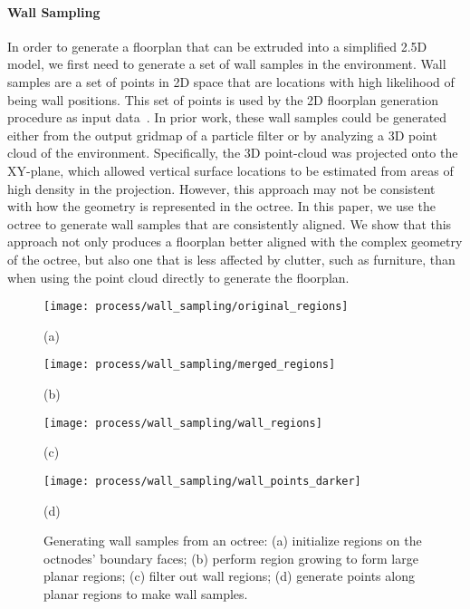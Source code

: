\documentclass[review]{acmsiggraph}
\begin{document}
\paragraph*{Wall Sampling}
\label{pg:wallsampling}

In order to generate a floorplan that can be extruded into a simplified 2.5D model, we first need to generate a set of wall samples in the environment.  Wall samples are a set of points in 2D space that are locations with high likelihood of being wall positions.  This set of points is used by the 2D floorplan generation procedure as input data~\cite{Turner14}.  In prior work, these wall samples could be generated either from the output gridmap of a particle filter or by analyzing a 3D point cloud of the environment.  Specifically, the 3D point-cloud was projected onto the XY-plane, which allowed vertical surface locations to be estimated from areas of high density in the projection.  However, this approach may not be consistent with how the geometry is represented in the octree.  In this paper, we use the octree to generate wall samples that are consistently aligned.  We show that this approach not only produces a floorplan better aligned with the complex geometry of the octree, but also one that is less affected by clutter, such as furniture, than when using the point cloud directly to generate the floorplan.

\begin{figure}[t]
	\begin{minipage}[t]{0.45\linewidth}
		\centerline{\texttt{[image: process/wall\_sampling/original\_regions]}}
		\centerline{(a)}
	\end{minipage}
	\hfill
	\begin{minipage}[t]{0.45\linewidth}
		\centerline{\texttt{[image: process/wall\_sampling/merged\_regions]}}
		\centerline{(b)}
	\end{minipage}
	
	\begin{minipage}[t]{0.45\linewidth}
		\centerline{\texttt{[image: process/wall\_sampling/wall\_regions]}}
		\centerline{(c)}
	\end{minipage}
	\hfill
	\begin{minipage}[t]{0.45\linewidth}
		\centerline{\texttt{[image: process/wall\_sampling/wall\_points\_darker]}}
		\centerline{(d)}
	\end{minipage}

	\caption{Generating wall samples from an octree: (a) initialize regions on the octnodes' boundary faces; (b) perform region growing to form large planar regions; (c) filter out wall regions; (d) generate points along planar regions to make wall samples.}
	\label{fig:oct2dq}
\end{figure}
\end{document}
